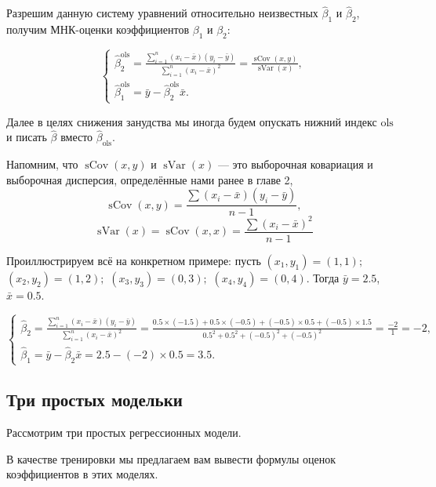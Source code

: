 \documentclass[12pt]{article}
\DeclareMathOperator{\sCov}{sCov}
\DeclareMathOperator{\sVar}{sVar}
\newcommand{\hb}{\hat{\beta}}
\newcommand{\ols}{\text{ols}}
\begin{document}
Разрешим данную систему уравнений относительно неизвестных $\hb_1$ и $\hb_2$, получим МНК-оценки коэффициентов $\beta_1$ и $\beta_2$:

\begin{equation*}
 \begin{cases}
\hb_2^{\ols} = \frac{\sum_{i=1}^n(x_i - \bar{x})(y_i - \bar{y})}{\sum_{i=1}^n(x_i-\bar{x})^2} = \frac{\sCov(x,y)}{\sVar(x)},
\\
\hb_1^{\ols} = \bar{y} - \hb_2^{\ols}\bar{x}.
 \end{cases}
\end{equation*}

Далее в целях снижения занудства мы иногда будем опускать нижний индекс $\ols$ и писать $\hb$ вместо $\hb_{\ols}$.

Напомним, что $\sCov(x, y)$ и $\sVar(x)$ — это выборочная ковариация и выборочная дисперсия, определённые нами ранее в главе 2,
\[
\sCov(x, y) = \frac{\sum (x_i - \bar x)(y_i - \bar y)}{n - 1}, 
\]
\[
\sVar(x) = \sCov(x, x) = \frac{\sum (x_i - \bar x)^2}{n - 1}
\]

Проиллюстрируем всё на конкретном примере: пусть $(x_1, y_1) = (1, 1);$ $(x_2, y_2) = (1, 2);$ $(x_3, y_3) = (0, 3);$ $(x_4, y_4) = (0, 4).$ Тогда $\bar{y} = 2.5$, $\bar{x} =  0.5$.

\begin{equation*}
 \begin{cases}
\hb_2 = \frac{\sum_{i=1}^n(x_i - \bar{x})(y_i - \bar{y})}{\sum_{i=1}^n(x_i-\bar{x})^2} = \frac{0.5 \times (-1.5) + 0.5 \times (-0.5) + (-0.5) \times 0.5 + (-0.5) \times 1.5}{0.5^2 + 0.5^2 + (-0.5)^2 + (-0.5)^2} = \frac{-2}{1} = -2,
\\
\hb_1 = \bar{y} - \hb_2\bar{x} = 2.5 - (-2)\times 0.5 = 3.5.
 \end{cases}
\end{equation*}

\subsection{Три простых модельки}
Рассмотрим три простых регрессионных модели. 

В качестве тренировки мы предлагаем вам
вывести формулы оценок коэффициентов в этих моделях.
\end{document}
